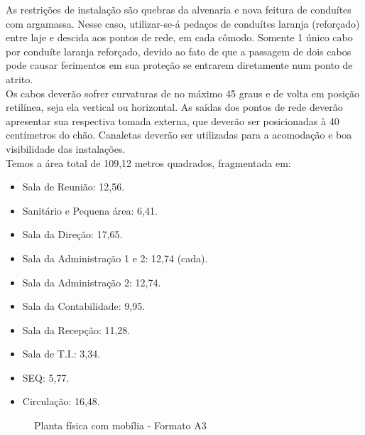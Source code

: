 \documentclass[	DIV=calc,%
							paper=a4,%
							fontsize=12pt,%
							onecolumn]{scrartcl}	 					%
\begin{document}
As restrições de instalação são quebras da alvenaria e nova feitura de conduítes com argamassa. Nesse caso, utilizar-se-á pedaços de conduítes laranja (reforçado) entre laje e descida aos pontos de rede, em cada cômodo. Somente 1 único cabo por conduíte laranja reforçado, devido ao fato de que a passagem de dois cabos pode causar ferimentos em sua proteção se entrarem diretamente num ponto de atrito.
\\

Os cabos deverão sofrer curvaturas de no máximo 45 graus e de volta em posição retilínea, seja ela vertical ou horizontal. As saídas dos pontos de rede deverão apresentar sua respectiva tomada externa, que deverão ser posicionadas à 40 centímetros do chão. Canaletas deverão ser utilizadas para a acomodação e boa visibilidade das instalações.
\\

Temos a área total de 109,12 metros quadrados, fragmentada em:

\begin{itemize}
	\item Sala de Reunião: 12,56.
	\item Sanitário e Pequena área: 6,41.
	\item Sala da Direção: 17,65.
	\item Sala da Administração 1 e 2: 12,74 (cada).
	\item Sala da Administração 2: 12,74.
	\item Sala da Contabilidade: 9,95.
	\item Sala da Recepção: 11,28.
	\item Sala de T.I.: 3,34.
	\item SEQ: 5,77.
	\item Circulação: 16,48.
	
	
\end{itemize}


\clearpage
{}
\recalctypearea

\begin{figure}
	\noindent{}
	\caption{Planta física com mobília - Formato A3}
	\label{fig1}
\end{figure}
\end{document}
